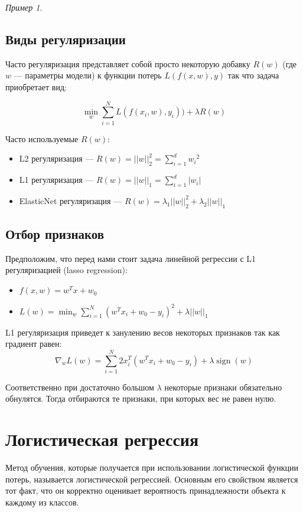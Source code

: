 \documentclass[a4paper, 12pt]{article}
\DeclareMathOperator{\sgn}{sign }
\theoremstyle{plain} %
\theoremstyle{definition} %
\theoremstyle{remark} %
\newtheorem{example}{Пример}
\begin{document}
\begin{example}
\subsection{Виды регуляризации}

Часто регуляризация представляет собой просто некоторую добавку $ R(w) $
 (где $ w $
 — параметры модели) к функции потерь $ L(f(x, w), y) $
 так что задача приобретает вид:

\[
	\min_{\displaystyle w} \sum_{i=1}^N L(f(x_i, w), y_i)) + \lambda R(w)
\]

Часто используемые $ R(w) $:
\begin{itemize}
	\item L2 регуляризация — $ R(w) = ||w||_2^2 = \sum_{i=1}^d {w_i}^2 $
	\item L1 регуляризация — $ R(w) = ||w||_1 = \sum_{i=1}^d |w_i| $
	\item ElasticNet регуляризация — $ R(w) = \lambda_1 ||w||_2^2 + \lambda_2 ||w||_1 $
\end{itemize}

\subsection{Отбор признаков}

Предположим, что перед нами стоит задача линейной регрессии с L1 регуляризацией (lasso regression):

\begin{itemize}
	\item $ f(x, w) = w^Tx + w_0 $
	\item $ L(w) = \min_{\displaystyle w} \sum_{i=1}^N (w^Tx_i + w_0 - y_i)^2 + \lambda ||w||_1 $
\end{itemize}

L1 регуляризация приведет к занулению весов некоторых признаков так как градиент равен:
\[
	\nabla_w L(w) = \sum_{i=1}^N 2x_i^T (w^Tx_i + w_0 - y_i) + \lambda \sgn(w)
\]

Соответственно при достаточно большом $ \lambda $
 некоторые признаки обязательно обнулятся. Тогда отбираются те признаки, при которых вес не равен нулю.

\section{Логистическая регрессия}

Метод обучения, которые получается при использовании логистической функции потерь,
называется логистической регрессией.
Основным его свойством является тот факт, что он корректно оценивает вероятность
принадлежности объекта к каждому из классов.


\end{example}
\end{document}
